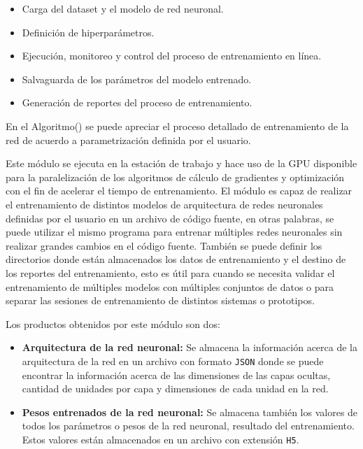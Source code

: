     \begin{itemize}
        \item Carga del dataset y el modelo de red neuronal.
        \item Definición de hiperparámetros.
        \item Ejecución, monitoreo y control del proceso de entrenamiento en línea. 
        \item Salvaguarda de los parámetros del modelo entrenado.
        \item Generación de reportes del proceso de entrenamiento.
    \end{itemize}

    En el Algoritmo() se puede apreciar el proceso detallado de entrenamiento de la red de acuerdo a parametrización definida 
    por el usuario. 
    

    Este módulo se ejecuta en la estación de trabajo y hace uso de la GPU disponible para la paralelización de los algoritmos de 
    cálculo de gradientes y optimización con el fin de acelerar el tiempo de entrenamiento. El módulo es capaz de realizar 
    el entrenamiento de distintos modelos de arquitectura de redes neuronales definidas por el usuario en un archivo de código 
    fuente, en otras palabras, se puede utilizar el mismo programa para entrenar múltiples redes neuronales sin realizar grandes 
    cambios en el código fuente. También se puede definir los directorios donde están almacenados los datos de entrenamiento y 
    el destino de los reportes del entrenamiento, esto es útil para cuando se necesita validar el entrenamiento de múltiples 
    modelos con múltiples conjuntos de datos o para separar las sesiones de entrenamiento de distintos sistemas o prototipos.

    Los productos obtenidos por este módulo son dos:
    
    \begin{itemize}
        \item \textbf{Arquitectura de la red neuronal:} Se almacena la información acerca de la arquitectura de la red en un archivo con formato \lstinline{JSON} donde se puede encontrar la información acerca de las dimensiones de las capas ocultas, cantidad de unidades por capa y dimensiones de cada unidad en la red.
        \item \textbf{Pesos entrenados de la red neuronal:} Se almacena también los valores de todos los parámetros o pesos de la red neuronal, resultado del entrenamiento. Estos valores están almacenados en un archivo con extensión \lstinline{H5}. 
    \end{itemize}

